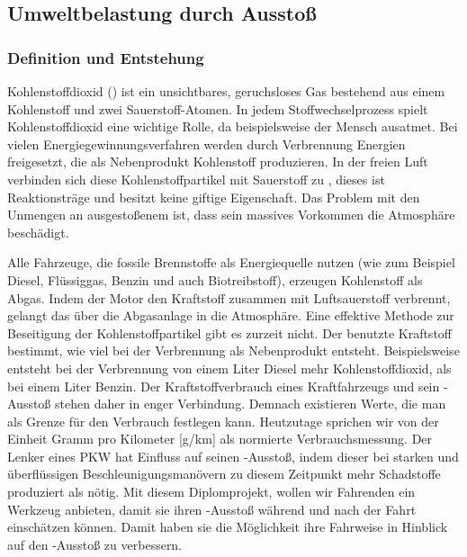 \subsection{Umweltbelastung durch  Ausstoß}

\subsubsection{Definition und Entstehung}
Kohlenstoffdioxid () ist ein unsichtbares, geruchsloses Gas bestehend aus einem Kohlenstoff und zwei Sauerstoff-Atomen. 
In jedem Stoffwechselprozess spielt Kohlenstoffdioxid eine wichtige Rolle, da beispielsweise der Mensch  ausatmet. 
Bei vielen Energiegewinnungsverfahren werden durch Verbrennung Energien freigesetzt, die als Nebenprodukt Kohlenstoff produzieren. 
In der freien Luft verbinden sich diese Kohlenstoffpartikel mit Sauerstoff zu , dieses ist
Reaktionsträge und besitzt keine giftige Eigenschaft. 
Das Problem mit den Unmengen an ausgestoßenem  ist, dass sein massives Vorkommen die Atmosphäre beschädigt.

Alle Fahrzeuge, die fossile Brennstoffe als Energiequelle nutzen 
(wie zum Beispiel Diesel, Flüssiggas, Benzin und auch Biotreibstoff), erzeugen Kohlenstoff als Abgas. 
Indem der Motor den Kraftstoff zusammen mit Luftsauerstoff verbrennt, gelangt das  über die Abgasanlage in die Atmosphäre. 
Eine effektive Methode zur Beseitigung der Kohlenstoffpartikel gibt es zurzeit nicht. 
Der benutzte Kraftstoff bestimmt, wie viel  bei der Verbrennung als Nebenprodukt entsteht.
Beispielsweise entsteht bei der Verbrennung von einem Liter Diesel mehr Kohlenstoffdioxid, als bei einem Liter Benzin.
Der Kraftstoffverbrauch eines Kraftfahrzeugs und sein -Ausstoß stehen daher in enger Verbindung.
Demnach existieren Werte, die man als Grenze für den Verbrauch festlegen kann. 
Heutzutage sprichen wir von der Einheit Gramm pro Kilometer [g/km] als normierte Verbrauchsmessung.
Der Lenker eines PKW hat Einfluss auf seinen -Ausstoß, indem dieser bei starken und überflüssigen Beschleunigungsmanövern
zu diesem Zeitpunkt mehr Schadstoffe produziert als nötig.
Mit diesem Diplomprojekt, wollen wir Fahrenden ein Werkzeug anbieten, damit sie ihren -Ausstoß während und nach der Fahrt
einschätzen können. Damit haben sie die Möglichkeit ihre Fahrweise in Hinblick auf den -Ausstoß zu verbessern.

\clearpage

